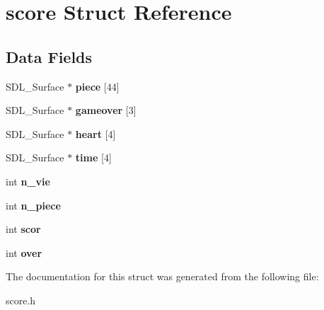 \hypertarget{structscore}{}\section{score Struct Reference}
\label{structscore}
\subsection*{Data Fields}
\begin{DoxyCompactItemize}
\item 
S\+D\+L\+\_\+\+Surface $\ast$ {\bfseries piece} \mbox{[}44\mbox{]}\hypertarget{structscore_ae3318511be97e3b762a92b970032028a}{}\label{structscore_ae3318511be97e3b762a92b970032028a}

\item 
S\+D\+L\+\_\+\+Surface $\ast$ {\bfseries gameover} \mbox{[}3\mbox{]}\hypertarget{structscore_a6e14104e8beb273ae65211e0b379a7d1}{}\label{structscore_a6e14104e8beb273ae65211e0b379a7d1}

\item 
S\+D\+L\+\_\+\+Surface $\ast$ {\bfseries heart} \mbox{[}4\mbox{]}\hypertarget{structscore_a15422a9fc54ddbf516baef662a5e9d57}{}\label{structscore_a15422a9fc54ddbf516baef662a5e9d57}

\item 
S\+D\+L\+\_\+\+Surface $\ast$ {\bfseries time} \mbox{[}4\mbox{]}\hypertarget{structscore_a9bcc202b2c2739d0681d4e205ace192e}{}\label{structscore_a9bcc202b2c2739d0681d4e205ace192e}

\item 
int {\bfseries n\+\_\+vie}\hypertarget{structscore_a6f45987ef60dd66d6e4ee85ef488c897}{}\label{structscore_a6f45987ef60dd66d6e4ee85ef488c897}

\item 
int {\bfseries n\+\_\+piece}\hypertarget{structscore_af4464d5820a18fa853965d857c4fa0c5}{}\label{structscore_af4464d5820a18fa853965d857c4fa0c5}

\item 
int {\bfseries scor}\hypertarget{structscore_ac224f44e61cd91bd010246e73fbacf8c}{}\label{structscore_ac224f44e61cd91bd010246e73fbacf8c}

\item 
int {\bfseries over}\hypertarget{structscore_abff7119f1e151d9a7feecdddd0a047a0}{}\label{structscore_abff7119f1e151d9a7feecdddd0a047a0}

\end{DoxyCompactItemize}


The documentation for this struct was generated from the following file\+:\begin{DoxyCompactItemize}
\item 
score.\+h\end{DoxyCompactItemize}
